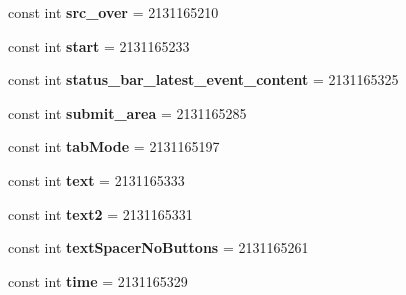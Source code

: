 \begin{DoxyCompactItemize}
\mbox{\label{class_sample_app_1_1_droid_1_1_resource_1_1_id_a9c9475eba5223a32e248874ff9af7350}} 
const int {\bfseries src\+\_\+over} = 2131165210
\item 
\mbox{\label{class_sample_app_1_1_droid_1_1_resource_1_1_id_a0cdcb4220a7fc061e70abf03ee571754}} 
const int {\bfseries start} = 2131165233
\item 
\mbox{\label{class_sample_app_1_1_droid_1_1_resource_1_1_id_a70dae180adf74dc278b8c56dad22e0ab}} 
const int {\bfseries status\+\_\+bar\+\_\+latest\+\_\+event\+\_\+content} = 2131165325
\item 
\mbox{\label{class_sample_app_1_1_droid_1_1_resource_1_1_id_ab83d931f015ba424fe11b30bb1016245}} 
const int {\bfseries submit\+\_\+area} = 2131165285
\item 
\mbox{\label{class_sample_app_1_1_droid_1_1_resource_1_1_id_a5dd24cbd9da9486a034c4d12b6f63168}} 
const int {\bfseries tab\+Mode} = 2131165197
\item 
\mbox{\label{class_sample_app_1_1_droid_1_1_resource_1_1_id_a8841e6e73f049e7d18a5d9027140282f}} 
const int {\bfseries text} = 2131165333
\item 
\mbox{\label{class_sample_app_1_1_droid_1_1_resource_1_1_id_a82196ea5ed2cb1b97a53b46bfedc0e4f}} 
const int {\bfseries text2} = 2131165331
\item 
\mbox{\label{class_sample_app_1_1_droid_1_1_resource_1_1_id_ab472bff80bcab5dac3bc248fde93c436}} 
const int {\bfseries text\+Spacer\+No\+Buttons} = 2131165261
\item 
\mbox{\label{class_sample_app_1_1_droid_1_1_resource_1_1_id_a8b86a2c416d84a863bf28c63219a0bea}} 
const int {\bfseries time} = 2131165329
\item 
\mbox{\label{class_sample_app_1_1_droid_1_1_resource_1_1_id_ae5c8fcb001387b4fe12434159c1a467f}} 

\end{DoxyCompactItemize}
